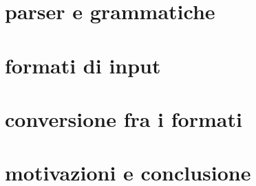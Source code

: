 \documentclass[12pt, a4paper]{report}
\begin{document}


\tableofcontents
\thispagestyle{empty}

\chapter{parser e grammatiche}


\chapter{formati di input}


\chapter{conversione fra i formati}


\chapter{motivazioni e conclusione}




\end{document}
